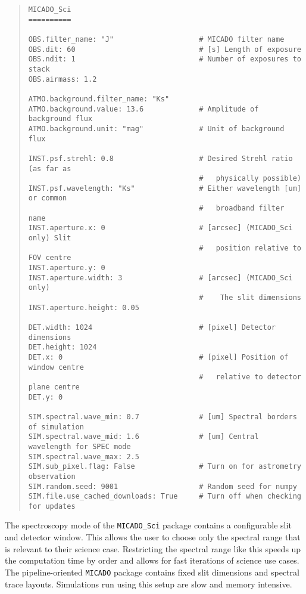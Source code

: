 \begin{quote}
\begin{alltt}
\begin{lstlisting}[frame=single]
MICADO_Sci
==========

OBS.filter_name: "J"                    # MICADO filter name
OBS.dit: 60                             # [s] Length of exposure
OBS.ndit: 1                             # Number of exposures to stack
OBS.airmass: 1.2

ATMO.background.filter_name: "Ks"
ATMO.background.value: 13.6             # Amplitude of background flux
ATMO.background.unit: "mag"             # Unit of background flux

INST.psf.strehl: 0.8                    # Desired Strehl ratio (as far as 
                                        #   physically possible)
INST.psf.wavelength: "Ks"               # Either wavelength [um] or common 
                                        #   broadband filter name
INST.aperture.x: 0                      # [arcsec] (MICADO_Sci only) Slit
                                        #   position relative to FOV centre
INST.aperture.y: 0
INST.aperture.width: 3                  # [arcsec] (MICADO_Sci only) 
                                        #    The slit dimensions
INST.aperture.height: 0.05

DET.width: 1024                         # [pixel] Detector dimensions
DET.height: 1024
DET.x: 0                                # [pixel] Position of window centre 
                                        #   relative to detector plane centre
DET.y: 0

SIM.spectral.wave_min: 0.7              # [um] Spectral borders of simulation
SIM.spectral.wave_mid: 1.6              # [um] Central wavelength for SPEC mode
SIM.spectral.wave_max: 2.5
SIM.sub_pixel.flag: False               # Turn on for astrometry observation
SIM.random.seed: 9001                   # Random seed for numpy
SIM.file.use_cached_downloads: True     # Turn off when checking for updates
\end{lstlisting}
\end{alltt}
\end{quote}

The spectroscopy mode of the \texttt{MICADO\_Sci} package contains a configurable slit and detector window.
This allows the user to choose only the spectral range that is relevant to their science case.
Restricting the spectral range like this speeds up the computation time by order and allows for fast iterations of science use cases.
The pipeline-oriented \texttt{MICADO} package contains fixed slit dimensions and spectral trace layouts.
Simulations run using this setup are slow and memory intensive.


